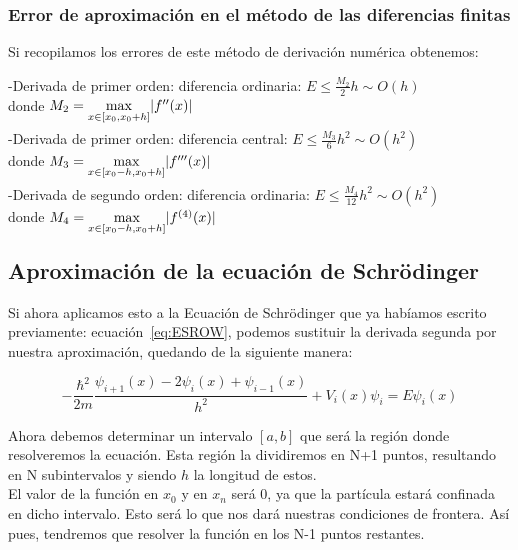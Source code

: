 \documentclass[12pt]{article}
\begin{document}
\subsubsection{Error de aproximación en el método de las diferencias finitas}

Si recopilamos los errores de este método de derivación numérica obtenemos:

\begin{flushleft}
-Derivada de primer orden: diferencia ordinaria: 
$E \leq \frac{M_2}{2}h \sim O(h)$\\ donde $M_2 = \smash{\displaystyle\max_{x \in [x_0,x_0+h]}} |f''(x)|$
\end{flushleft}

\begin{flushleft}
-Derivada de primer orden: diferencia central: 
$E \leq \frac{M_3}{6}h^2 \sim O(h^2)$\\ donde $M_3 = \smash{\displaystyle\max_{x \in [x_0-h,x_0+h]}} |f'''(x)|$
\end{flushleft}

\begin{flushleft}
-Derivada de segundo orden: diferencia ordinaria:
$E \leq \frac{M_4}{12}h^2 \sim O(h^2)$\\ donde $M_4 = \smash{\displaystyle\max_{x \in [x_0-h,x_0+h]}} |f^{(4)}(x)|$
\end{flushleft}




\subsection{Aproximación de la ecuación de Schrödinger}
Si ahora aplicamos esto a la Ecuación de Schrödinger que ya habíamos escrito previamente: ecuación~\eqref{eq:ESROW}, podemos sustituir la derivada segunda por nuestra aproximación, quedando de la siguiente manera:

\begin{equation}
-\frac{\hbar^2}{2m} \frac{\psi_{i+1}(x)-2\psi_i(x)+\psi_{i-1}(x)}{h^2} + V_i(x)\psi_i = E \psi_i(x)
\end{equation}

Ahora debemos determinar un intervalo $[a,b]$ que será la región donde resolveremos 
la ecuación. Esta región la dividiremos en N+1 puntos, resultando en N subintervalos y siendo $h$ la longitud de estos.\\

El valor de la función en $x_0$ y en $x_n$ será 0, ya que la partícula estará confinada en dicho intervalo. Esto será lo que nos dará nuestras condiciones de frontera. Así pues, tendremos que resolver la función en los N-1 puntos restantes.
\end{document}
